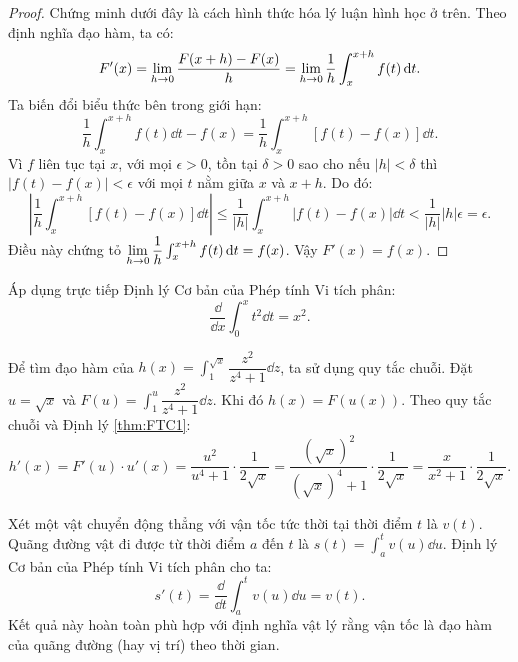 

\begin{proof}
    Chứng minh dưới đây là cách hình thức hóa lý luận hình học ở trên. Theo định nghĩa đạo hàm, ta có:
    \[ F'(x) = \lim\limits_{h \to 0} \dfrac{F(x+h) - F(x)}{h} = \lim\limits_{h \to 0} \dfrac{1}{h} \int_{x}^{x+h} f(t) \,\mathrm{d} t. \]
    Ta biến đổi biểu thức bên trong giới hạn:
    \[ \dfrac{1}{h} \int_{x}^{x+h} f(t) \dd t - f(x) = \dfrac{1}{h} \int_{x}^{x+h} [f(t) - f(x)] \dd t. \]
    Vì $f$ liên tục tại $x$, với mọi $\epsilon > 0$, tồn tại $\delta > 0$ sao cho nếu $|h| < \delta$ thì $|f(t) - f(x)| < \epsilon$ với mọi $t$ nằm giữa $x$ và $x+h$. Do đó:
    \[ \left| \dfrac{1}{h} \int_{x}^{x+h} [f(t) - f(x)] \dd t \right| \le \dfrac{1}{|h|} \int_{x}^{x+h} |f(t) - f(x)| \dd t < \dfrac{1}{|h|} |h| \epsilon = \epsilon. \]
    Điều này chứng tỏ $\lim\limits_{h \to 0} \dfrac{1}{h} \int_{x}^{x+h} f(t) \,\mathrm{d} t = f(x)$. Vậy $F'(x) = f(x)$.
\end{proof}

\begin{example}
    Áp dụng trực tiếp Định lý Cơ bản của Phép tính Vi tích phân:
    \[ \dfrac{\dd}{\dd x} \int_{0}^{x} t^2 \dd t = x^2. \]
\end{example}

\begin{example}
    Để tìm đạo hàm của $h(x) = \int_{1}^{\sqrt{x}} \dfrac{z^2}{z^4+1} \dd z$, ta sử dụng quy tắc chuỗi.
    Đặt $u = \sqrt{x}$ và $F(u) = \int_{1}^{u} \dfrac{z^2}{z^4+1} \dd z$.
    Khi đó $h(x) = F(u(x))$. Theo quy tắc chuỗi và Định lý \ref{thm:FTC1}:
    \[ h'(x) = F'(u) \cdot u'(x) = \dfrac{u^2}{u^4+1} \cdot \dfrac{1}{2\sqrt{x}} = \dfrac{(\sqrt{x})^2}{(\sqrt{x})^4+1} \cdot \dfrac{1}{2\sqrt{x}} = \dfrac{x}{x^2+1} \cdot \dfrac{1}{2\sqrt{x}}. \]
\end{example}

\begin{example}
    Xét một vật chuyển động thẳng với vận tốc tức thời tại thời điểm $t$ là $v(t)$. Quãng đường vật đi được từ thời điểm $a$ đến $t$ là $s(t) = \int_a^t v(u) \dd u$.
    Định lý Cơ bản của Phép tính Vi tích phân cho ta:
    \[ s'(t) = \dfrac{\dd}{\dd t} \int_a^t v(u) \dd u = v(t). \]
    Kết quả này hoàn toàn phù hợp với định nghĩa vật lý rằng vận tốc là đạo hàm của quãng đường (hay vị trí) theo thời gian.
\end{example}


